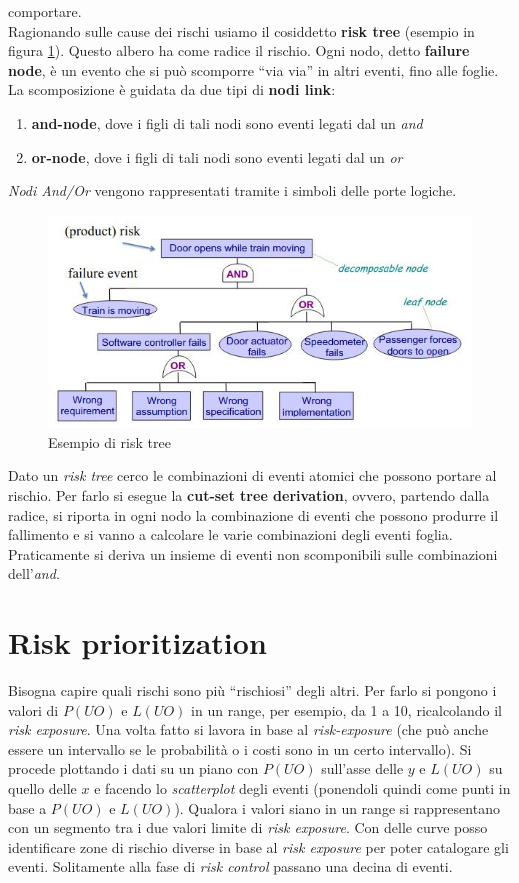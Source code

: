 \documentclass[a4paper,12pt, oneside]{book}
\begin{document}
comportare. \\
Ragionando sulle cause dei rischi usiamo il cosiddetto \textbf{risk
  tree} (esempio in figura \ref{treee}). Questo albero ha come radice il
rischio. Ogni nodo, detto 
\textbf{failure node}, è un evento che si può scomporre ``via via'' in altri
eventi, fino alle foglie. La scomposizione è guidata da due tipi di \textbf{nodi
  link}: 
\begin{enumerate}
  \item \textbf{and-node}, dove i figli di tali nodi sono eventi legati dal un
  \textit{and}
  \item \textbf{or-node}, dove i figli di tali nodi sono eventi legati dal un
  \textit{or}
\end{enumerate}
\textit{Nodi And/Or} vengono rappresentati tramite i simboli delle porte
logiche.\\
\begin{figure}
  \centering
  \includegraphics[scale = 0.6]{img/errr.jpg}
  \caption{Esempio di risk tree}
  \label{treee}
\end{figure}
Dato un \textit{risk tree} cerco le combinazioni di eventi atomici che possono
portare al rischio. Per farlo si esegue la \textbf{cut-set tree derivation},
ovvero, partendo dalla radice, si riporta in ogni nodo la combinazione di eventi
che possono produrre il fallimento e si vanno a calcolare le varie combinazioni
degli eventi foglia. Praticamente si deriva un insieme di eventi non
scomponibili sulle combinazioni dell'\textit{and}.
\section{Risk prioritization}
Bisogna capire quali rischi sono più ``rischiosi'' degli altri. Per farlo si
pongono i valori di $P(UO)$ e $L(UO)$ in un range, per esempio, da 1 a 10,
ricalcolando il \textit{risk exposure}. Una volta fatto si lavora in
base al \textit{risk-exposure} (che può anche essere un intervallo se le
probabilità o i costi sono in un certo intervallo). Si procede plottando i dati
su un piano con $P(UO)$ sull'asse delle $y$ e $L(UO)$ su quello delle
$x$ e facendo lo \textit{scatterplot} degli eventi (ponendoli quindi come punti
in base a $P(UO)$ e $L(UO)$). Qualora i valori siano in un range si
rappresentano con un segmento tra i due valori limite di \textit{risk
  exposure}. Con delle curve posso identificare zone di rischio diverse in base
al \textit{risk exposure} per poter catalogare gli eventi. Solitamente alla fase
di \textit{risk control} passano una decina di eventi.
\end{document}
